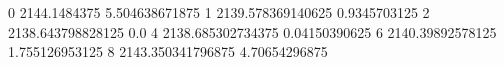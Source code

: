 0 2144.1484375 5.504638671875
1 2139.578369140625 0.9345703125
2 2138.643798828125 0.0
4 2138.685302734375 0.04150390625
6 2140.39892578125 1.755126953125
8 2143.350341796875 4.70654296875
